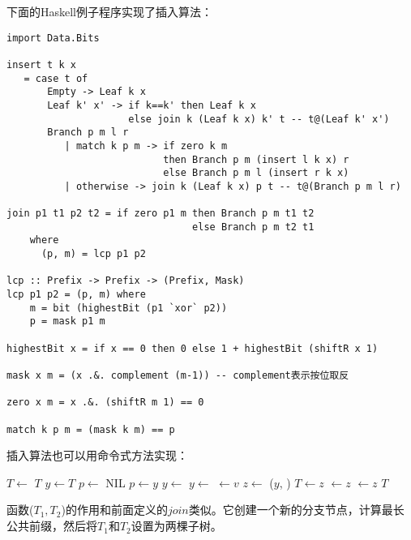 \documentclass[UTF8]{article}
\begin{document}
下面的Haskell例子程序实现了插入算法：

\begin{lstlisting}[style=Haskell]
import Data.Bits

insert t k x
   = case t of
       Empty -> Leaf k x
       Leaf k' x' -> if k==k' then Leaf k x
                     else join k (Leaf k x) k' t -- t@(Leaf k' x')
       Branch p m l r
          | match k p m -> if zero k m
                           then Branch p m (insert l k x) r
                           else Branch p m l (insert r k x)
          | otherwise -> join k (Leaf k x) p t -- t@(Branch p m l r)

join p1 t1 p2 t2 = if zero p1 m then Branch p m t1 t2
                                else Branch p m t2 t1
    where
      (p, m) = lcp p1 p2

lcp :: Prefix -> Prefix -> (Prefix, Mask)
lcp p1 p2 = (p, m) where
    m = bit (highestBit (p1 `xor` p2))
    p = mask p1 m

highestBit x = if x == 0 then 0 else 1 + highestBit (shiftR x 1)

mask x m = (x .&. complement (m-1)) -- complement表示按位取反

zero x m = x .&. (shiftR m 1) == 0

match k p m = (mask k m) == p
\end{lstlisting}

插入算法也可以用命令式方法实现：

\begin{algorithmic}[1]
    \State $T \gets$ 
    \State \Return $T$
  \EndIf
  \State $y \gets T$
  \State $p \gets$ NIL
    \State $p \gets y$
      \State $y \gets$ 
    \Else
      \State $y \gets$ 
    \EndIf
  \EndWhile
    \State {} $\gets v$
  \Else
    \State $z \gets$ ($y$, )
      \State $T \gets z$
    \Else
        \State {} $\gets z$
      \Else
        \State {} $\gets z$
      \EndIf
    \EndIf
  \EndIf
  \State \Return $T$
\EndFunction
\end{algorithmic}

函数($T_1, T_2$)的作用和前面定义的$join$类似。它创建一个新的分支节点，计算最长公共前缀，然后将$T_1$和$T_2$设置为两棵子树。
\end{document}
